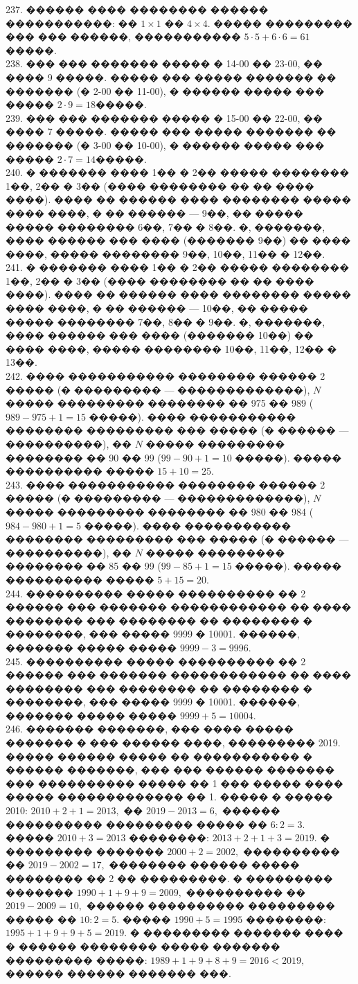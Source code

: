 \documentclass[12pt]{article}
\begin{document}
237. ������ ���� �������� ������ �����������: �� $1\times1$ �� $4\times4.$ ����� ��������� ��� ��� ������, ����������� $5\cdot5+6\cdot6=61$ �����.\\
238. ��� ��� ������� ����� � 14-00 �� 23-00, �� ���� 9 �����. ����� ��� ����� ������� �� ������� (� 2-00 �� 11-00), � ������ ����� ��� ����� $2\cdot9=18$�����.\\
239. ��� ��� ������� ����� � 15-00 �� 22-00, �� ���� 7 �����. ����� ��� ����� ������� �� ������� (� 3-00 �� 10-00), � ������ ����� ��� ����� $2\cdot7=14$�����.\\
240. � ������� ���� 1�� � 2�� ����� �������� 1��, 2�� � 3�� (���� �������� �� �� ���� ����). ���� �� ������ ���� �������� ����� ���� ����, � �� ������ --- 9��, �� ����� ����� �������� 6��, 7�� � 8��. �, �������, ���� ������ ��� ���� (������� 9��) �� ���� ����, ����� �������� 9��, 10��, 11�� � 12��.\\
241. � ������� ���� 1�� � 2�� ����� �������� 1��, 2�� � 3�� (���� �������� �� �� ���� ����). ���� �� ������ ���� �������� ����� ���� ����, � �� ������ --- 10��, �� ����� ����� �������� 7��, 8�� � 9��. �, �������, ���� ������ ��� ���� (������� 10��) �� ���� ����, ����� �������� 10��, 11��, 12�� � 13��.\\
242. ���� ����������� �������� ������ 2 ����� (� ��������� --- �������������), $N$ ����� ��������� �������� �� 975 �� 989 ($989-975+1=15$ �����). ���� ����������� �������� ��������� ��� ����� (� ������ --- ����������), �� $N$ ����� ��������� �������� �� 90 �� 99 ($99-90+1=10$ �����). ����� ���������� ����� $15+10=25.$\\
243. ���� ����������� �������� ������ 2 ����� (� ��������� --- �������������), $N$ ����� ��������� �������� �� 980 �� 984 ($984-980+1=5$ �����). ���� ����������� �������� ��������� ��� ����� (� ������ --- ����������), �� $N$ ����� ��������� �������� �� 85 �� 99 ($99-85+1=15$ �����). ����� ���������� ����� $5+15=20.$\\
244. ���������� ����� ���������� �� 2 ������ ��� ������� ������������ �� ���� �������� ��� �������� �� �������� � ��������, ��� ����� 9999 � 10001. ������, ������� ����� ����� $9999-3=9996.$\\
245. ���������� ����� ���������� �� 2 ������ ��� ������� ������������ �� ���� �������� ��� �������� �� �������� � ��������, ��� ����� 9999 � 10001. ������, ������� ����� ����� $9999+5=10004.$\\
246. ������� �������, ��� ���� ����� ������� � ��� ������ ����, ��������� 2019. ����� ������ ����� �� ����������� � ������ �������, ��� ��� ������ ������� ��� ���������� ����� �� 1 ��� ����� ���� ����� ������������� �� 1. ����� � ����� 2010: $2010+2+1=2013,$ �� $2019-2013=6,$ ������ ���������� ��������� ����� �� $6:2=3.$ ����� $2010+3=2013$ ��������: $2013+2+1+3=2019.$ � ��������� ������� $2000+2=2002,$ ���������� �� $2019-2002=17,$ �������� ������ ����� �������� �� 2 �� ���������. � ��������� ������� $1990+1+9+9=2009,$ ���������� �� $2019-2009=10,$ ������ ���������� ��������� ����� �� $10:2=5.$ ����� $1990+5=1995$ ��������: $1995+1+9+9+5=2019.$ � ��������� ������� ���� � ������ �������� ����� ������� ��������� �����: $1989+1+9+8+9=2016<2019,$ ������ ������ ������� ���.\\
\end{document}
